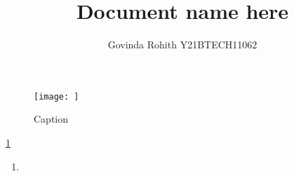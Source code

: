 \documentclass[12pt]{article}
\title{Document name here}
\author{Govinda Rohith Y\CS21BTECH11062}
\date{}
\begin{document}
\maketitle
\begin{figure}
    \centering 
    \texttt{[image: ]}
    \caption{Caption}
    \label{fig:my_label}
\end{figure}
\ref{fig:my_label}
\begin{enumerate}
    \item 
\end{enumerate}
\end{document}
